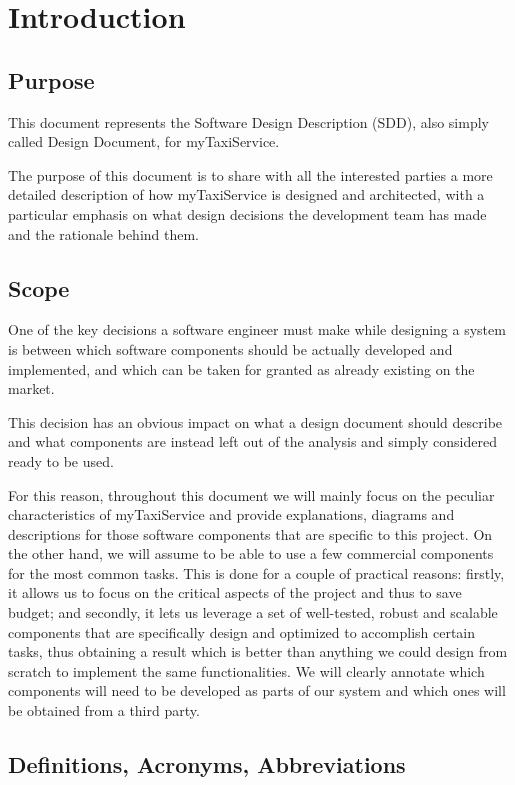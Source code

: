 \chapter{Introduction}

\section{Purpose}
This document represents the Software Design Description (SDD), also simply called Design Document, for myTaxiService.

The purpose of this document is to share with all the interested parties a more detailed description of how myTaxiService is designed and architected, with a particular emphasis on what design decisions the development team has made and the rationale behind them.

\section{Scope}
One of the key decisions a software engineer must make while designing a system is between which software components should be actually developed and implemented, and which can be taken for granted as already existing on the market. 

This decision has an obvious impact on what a design document should describe and what components are instead left out of the analysis and simply considered ready to be used.

For this reason, throughout this document we will mainly focus on the peculiar characteristics of myTaxiService and provide explanations, diagrams and descriptions for those software components that are specific to this project. On the other hand, we will assume to be able to use a few commercial components for the most common tasks. This is done for a couple of practical reasons: firstly, it allows us to focus on the critical aspects of the project and thus to save budget; and secondly, it lets us leverage a set of well-tested, robust and scalable components that are specifically design and optimized to accomplish certain tasks, thus obtaining a result which is better than anything we could design from scratch to implement the same functionalities. We will clearly annotate which components will need to be developed as parts of our system and which ones will be obtained from a third party.


\section{Definitions, Acronyms, Abbreviations}
